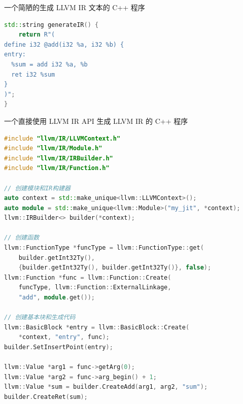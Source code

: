 
一个简陋的生成 LLVM IR 文本的 C++ 程序
\begin{lstlisting}[language=cpp]
std::string generateIR() {
    return R"(
define i32 @add(i32 %a, i32 %b) {
entry:
  %sum = add i32 %a, %b
  ret i32 %sum
}
)";
}
\end{lstlisting}

一个直接使用 LLVM IR API 生成 LLVM IR 的 C++ 程序
\begin{lstlisting}[language=cpp]
#include "llvm/IR/LLVMContext.h"
#include "llvm/IR/Module.h"
#include "llvm/IR/IRBuilder.h"
#include "llvm/IR/Function.h"

// 创建模块和IR构建器
auto context = std::make_unique<llvm::LLVMContext>();
auto module = std::make_unique<llvm::Module>("my_jit", *context);
llvm::IRBuilder<> builder(*context);

// 创建函数
llvm::FunctionType *funcType = llvm::FunctionType::get(
    builder.getInt32Ty(),
    {builder.getInt32Ty(), builder.getInt32Ty()}, false);
llvm::Function *func = llvm::Function::Create(
    funcType, llvm::Function::ExternalLinkage,
    "add", module.get());

// 创建基本块和生成代码
llvm::BasicBlock *entry = llvm::BasicBlock::Create(
    *context, "entry", func);
builder.SetInsertPoint(entry);

llvm::Value *arg1 = func->getArg(0);
llvm::Value *arg2 = func->arg_begin() + 1;
llvm::Value *sum = builder.CreateAdd(arg1, arg2, "sum");
builder.CreateRet(sum);
\end{lstlisting}
